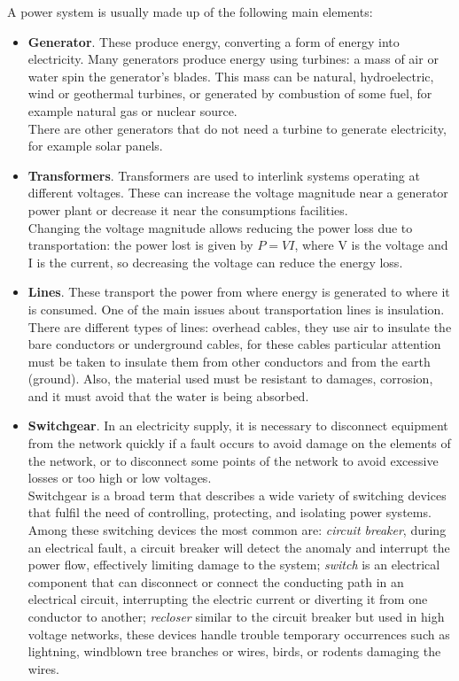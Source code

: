 \noindent A power system is usually made up of the following main elements:
\begin{itemize}
    \item \textbf{Generator}. These produce energy, converting a form of energy into electricity. Many generators produce energy using turbines: a mass of air or water spin the generator's blades. This mass can be natural, hydroelectric, wind or geothermal turbines, or generated by combustion of some fuel, for example natural gas or nuclear source. \\
    There are other generators that do not need a turbine to generate electricity, for example solar panels.
    \item \textbf{Transformers}. Transformers are used to interlink systems operating at different voltages. These can increase  the voltage magnitude near a generator power plant or decrease it near the consumptions facilities. \\
    Changing the voltage magnitude allows reducing the power loss due to transportation: the power lost is given by $P=VI$, where \gls{V} is the voltage and \gls{I} is the current, so decreasing the voltage can reduce the energy loss.
    \item \textbf{Lines}. These transport the power from where energy is generated to where it is consumed. One of the main issues about transportation lines is insulation. \\
    There are different types of lines: overhead cables, they use air to insulate the bare conductors or underground cables, for these cables particular attention must be taken to insulate them from other conductors and from the earth (ground). Also, the material used must be resistant to damages, corrosion, and it must avoid that the water is being absorbed.
    \item \textbf{Switchgear}. In an electricity supply, it is necessary to disconnect equipment from the network quickly if a fault occurs to avoid damage on the elements of the network, or to disconnect some points of the network to avoid excessive losses or too high or low voltages. \\
    Switchgear is a broad term that describes a wide variety of switching devices that fulfil the need of controlling, protecting, and isolating power systems. Among these switching devices the most common are: \emph{circuit breaker}, during an electrical fault, a circuit breaker will detect the anomaly and interrupt the power flow, effectively limiting damage to the system; \emph{switch} is an electrical component that can disconnect or connect the conducting path in an electrical circuit, interrupting the electric current or diverting it from one conductor to another; \emph{recloser} similar to the circuit breaker but used in high voltage networks, these devices handle trouble temporary occurrences such as lightning, windblown tree branches or wires,
    birds, or rodents damaging the wires.
    

\end{itemize}
